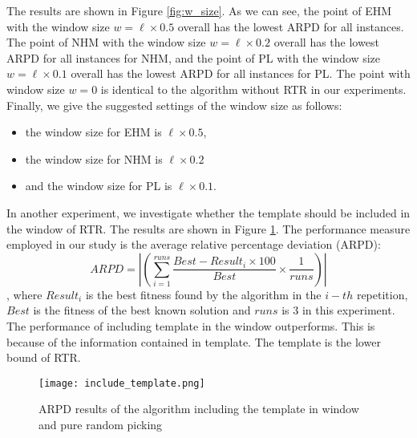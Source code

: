 The results are shown in Figure \ref{fig:w_size}. As we can see, the point of EHM with the window size $w=\ell\times 0.5$ overall has the lowest ARPD for all instances. The point of NHM with the window size $w=\ell\times 0.2$ overall has the lowest ARPD for all instances for NHM, and the point of PL with the window size $w=\ell\times 0.1$ overall has the lowest ARPD for all instances for PL. The point with window size $w=0$ is identical to the algorithm without RTR in our experiments. Finally, we give the suggested settings of the window size as follows:
\begin{itemize}
    \item the window size for EHM is $\ell\times 0.5$,
    \item the window size for NHM is $\ell\times 0.2$
    \item and the window size for PL is $\ell\times 0.1$.
\end{itemize}




In another experiment, we investigate whether the template should be included in the window of RTR. The results are shown in Figure \ref{fig:w_template}. The performance measure employed in our study is the average relative percentage deviation (ARPD):\[ARPD=\left|\left(\sum_{i=1}^{runs}\frac{Best-Result_i\times 100}{Best} \times \frac{1}{runs}\right)\right|\], where $Result_i$ is the best fitness found by the algorithm in the $i-th$ repetition, $Best$ is the fitness of the best known solution and $runs$ is 3 in this experiment. The performance of including template in the window outperforms. This is because of the information contained in template. The template is the lower bound of RTR.


\begin{figure}[htbp] 
        \centering
        \texttt{[image: include\_template.png]}
            \caption{ARPD results of the algorithm including the template in window and pure random picking} 
        \label{fig:w_template}
\end{figure}
